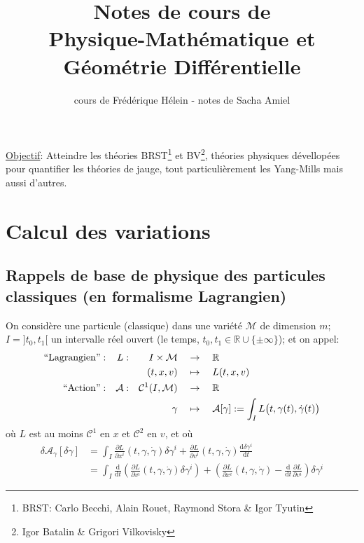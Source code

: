 \documentclass[a4paper,11pt]{article}
\renewcommand{\d}{{\mathrm{d}}}
\newcommand{\dr}[2]{\frac{\partial {#1}}{\partial{#2}}}
\begin{document}
\title{Notes de cours de\\Physique-Mathématique et Géométrie Différentielle}
\author{cours de Frédérique Hélein - notes de Sacha Amiel}
\maketitle
\tableofcontents
\newpage
\noindent\underline{Objectif}: Atteindre les théories BRST\footnote{BRST: Carlo Becchi, Alain Rouet, Raymond Stora \& Igor Tyutin} et BV\footnote{Igor Batalin \& Grigori Vilkovisky}, théories physiques dévellopées pour quantifier les théories de jauge, tout particulièrement les Yang-Mills mais aussi d'autres.

\section{Calcul des variations}
\subsection{Rappels de base de physique des particules classiques (en formalisme Lagrangien)}
\quad On considère une particule (classique) dans une variété $\mathcal{M}$ de dimension $m$; $I=]t_0,t_1[$ un intervalle réel ouvert (le temps, $t_0, t_1 \in \mathbb{R}\cup \{\pm \infty\}$); et on appel:
\begin{align*}
	``\mathrm{Lagrangien}":
		&&L: &&I\times\mathcal{M} \quad&\to\quad \mathbb{R}\\
		&&&& (t,x,v) \quad&\mapsto\quad L(t,x,v)\notag\\
	``\mathrm{Action}":
		&&\mathcal{A}: &&\mathcal{C}^1(I,\mathcal{M}) \quad &\to \quad	\mathbb{R}\\
		&&&&\gamma \quad&\mapsto\quad\mathcal{A}[\gamma]:=\int_I L\big(t,\gamma(t),\dot \gamma(t)\big)\notag
\end{align*}
où $L$ est au moins $\mathcal{C}^1$ en $x$ et $\mathcal{C}^2$ en $v$, et où
\begin{equation*}\begin{split}
\delta\mathcal{A}_\gamma[\delta\gamma]
&=\int_I \dr{L}{x^i}(t,\gamma,\dot \gamma)\delta\gamma^i + \dr{L}{v^i}(t,\gamma, \dot \gamma)\frac{\d \delta \gamma^i}{\d t}\\
&=\int_I \frac{\d}{\d t}\left(\dr{L}{v^i}(t,\gamma,\dot \gamma)\delta\gamma^i \right)+ \left(\dr{L}{x^i}(t,\gamma, \dot \gamma) - \frac{\d}{\d t}\dr{L}{v^i}\right)\delta \gamma^i
\end{split}\end{equation*}
\end{document}
